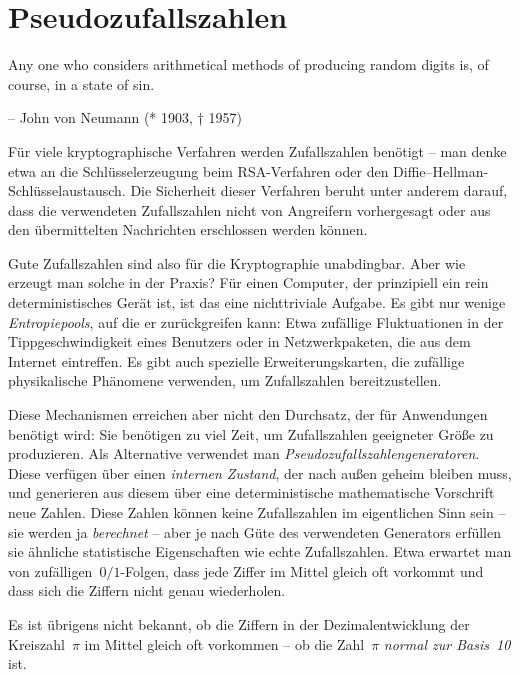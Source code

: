 \documentclass{zirkelblatt}
\newcommand{\head}[1]{\section*{\rmfamily #1}}%
\begin{document}
\head{Pseudozufallszahlen}

\begin{trivlist}\setlength\leftskip{3cm}\setlength\rightskip{0pt}\item
Any one who considers arithmetical methods of producing random digits is, of
course, in a state of sin.

-- John von Neumann (* 1903, † 1957)
\end{trivlist}

Für viele kryptographische Verfahren werden Zufallszahlen benötigt -- man denke
etwa an die Schlüsselerzeugung beim RSA-Verfahren oder den
Diffie--Hellman-Schlüsselaustausch. Die Sicherheit dieser Verfahren beruht
unter anderem darauf, dass die verwendeten Zufallszahlen nicht von Angreifern
vorhergesagt oder aus den übermittelten Nachrichten erschlossen werden können.

Gute Zufallszahlen sind also für die Kryptographie unabdingbar. Aber wie
erzeugt man solche in der Praxis? Für einen Computer, der prinzipiell ein rein
deterministisches Gerät ist, ist das eine nichttriviale Aufgabe. Es gibt nur
wenige \emph{Entropiepools}, auf die er zurückgreifen kann: Etwa zufällige
Fluktuationen in der Tippgeschwindigkeit eines Benutzers oder in
Netzwerkpaketen, die aus dem Internet eintreffen. Es gibt auch spezielle
Erweiterungskarten, die zufällige physikalische Phänomene verwenden, um
Zufallszahlen bereitzustellen.

Diese Mechanismen erreichen aber nicht den Durchsatz, der für Anwendungen
benötigt wird: Sie benötigen zu viel Zeit, um Zufallszahlen geeigneter Größe zu
produzieren. Als Alternative verwendet man
\emph{Pseudozufallszahlengeneratoren}. Diese verfügen über einen \emph{internen
Zustand}, der nach außen geheim bleiben muss, und generieren aus diesem über
eine deterministische mathematische Vorschrift neue Zahlen. Diese Zahlen können
keine Zufallszahlen im eigentlichen Sinn sein -- sie werden ja \emph{berechnet}
-- aber je nach Güte des verwendeten Generators erfüllen sie ähnliche
statistische Eigenschaften wie echte Zufallszahlen.
Etwa erwartet man von zufälligen~$0/1$-Folgen, dass jede Ziffer im Mittel
gleich oft vorkommt und dass sich die Ziffern nicht genau wiederholen.

Es ist übrigens nicht bekannt, ob die Ziffern in der Dezimalentwicklung der
Kreiszahl~$\pi$ im Mittel gleich oft vorkommen -- ob die Zahl~$\pi$
\emph{normal zur Basis~10} ist.
\end{document}
